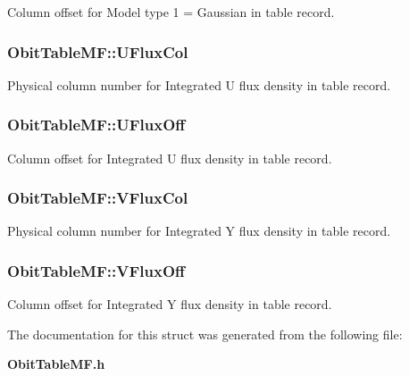 Column offset for Model type 1 = Gaussian in table record. 

\subsubsection{ {\bf Obit\-Table\-MF::UFlux\-Col}}\label{structObitTableMF_o39}


Physical column number for Integrated U flux density in table record. 

\subsubsection{ {\bf Obit\-Table\-MF::UFlux\-Off}}\label{structObitTableMF_o38}


Column offset for Integrated U flux density in table record. 

\subsubsection{ {\bf Obit\-Table\-MF::VFlux\-Col}}\label{structObitTableMF_o41}


Physical column number for Integrated Y flux density in table record. 

\subsubsection{ {\bf Obit\-Table\-MF::VFlux\-Off}}\label{structObitTableMF_o40}


Column offset for Integrated Y flux density in table record. 



The documentation for this struct was generated from the following file:\begin{CompactItemize}
\item 
{\bf Obit\-Table\-MF.h}\end{CompactItemize}
